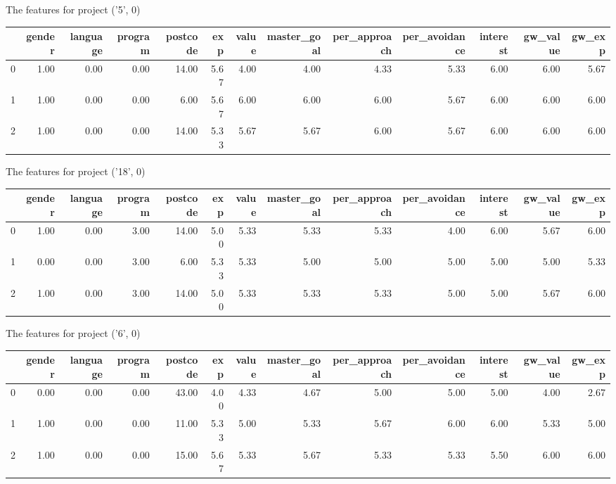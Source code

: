 \documentclass[7pt]{article}
\begin{document}
\begin{landscape}
The features for project ('5', 0)\newline
\begin{tabular}{lrrrrrrrrrrrr}
\toprule
{} &  gender &  language &  program &  postcode &  exp &  value &  master\_goal &  per\_approach &  per\_avoidance &  interest &  gw\_value &  gw\_exp \\
\midrule
0 &    1.00 &      0.00 &     0.00 &     14.00 & 5.67 &   4.00 &         4.00 &          4.33 &           5.33 &      6.00 &             6.00 &           5.67 \\
1 &    1.00 &      0.00 &     0.00 &      6.00 & 5.67 &   6.00 &         6.00 &          6.00 &           5.67 &      6.00 &             6.00 &           6.00 \\
2 &    1.00 &      0.00 &     0.00 &     14.00 & 5.33 &   5.67 &         5.67 &          6.00 &           5.67 &      6.00 &             6.00 &           6.00 \\
\bottomrule
\end{tabular}

The features for project ('18', 0)\newline
\begin{tabular}{lrrrrrrrrrrrr}
\toprule
{} &  gender &  language &  program &  postcode &  exp &  value &  master\_goal &  per\_approach &  per\_avoidance &  interest &  gw\_value &  gw\_exp \\
\midrule
0 &    1.00 &      0.00 &     3.00 &     14.00 & 5.00 &   5.33 &         5.33 &          5.33 &           4.00 &      6.00 &             5.67 &           6.00 \\
1 &    0.00 &      0.00 &     3.00 &      6.00 & 5.33 &   5.33 &         5.00 &          5.00 &           5.00 &      5.00 &             5.00 &           5.33 \\
2 &    1.00 &      0.00 &     3.00 &     14.00 & 5.00 &   5.33 &         5.33 &          5.33 &           5.00 &      5.00 &             5.67 &           6.00 \\
\bottomrule
\end{tabular}

The features for project ('6', 0)\newline
\begin{tabular}{lrrrrrrrrrrrr}
\toprule
{} &  gender &  language &  program &  postcode &  exp &  value &  master\_goal &  per\_approach &  per\_avoidance &  interest &  gw\_value &  gw\_exp \\
\midrule
0 &    0.00 &      0.00 &     0.00 &     43.00 & 4.00 &   4.33 &         4.67 &          5.00 &           5.00 &      5.00 &             4.00 &           2.67 \\
1 &    1.00 &      0.00 &     0.00 &     11.00 & 5.33 &   5.00 &         5.33 &          5.67 &           6.00 &      6.00 &             5.33 &           5.00 \\
2 &    1.00 &      0.00 &     0.00 &     15.00 & 5.67 &   5.33 &         5.67 &          5.33 &           5.33 &      5.50 &             6.00 &           6.00 \\
\bottomrule
\end{tabular}


\end{landscape}
\end{document}
